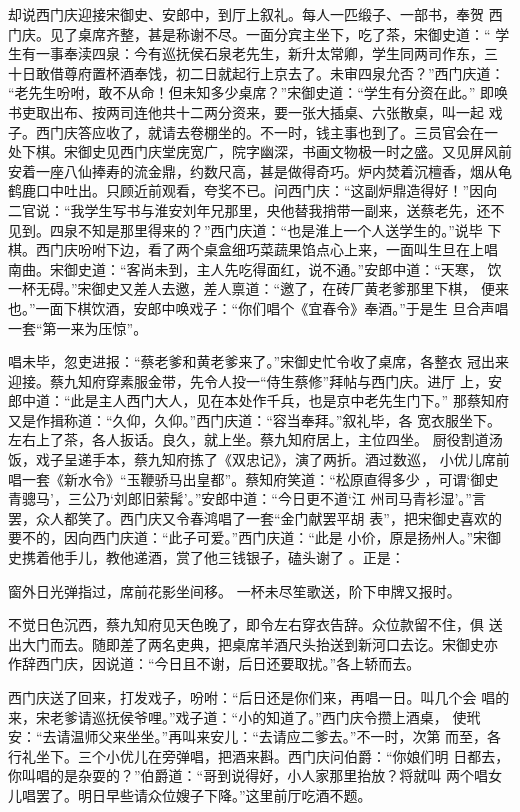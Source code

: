 却说西门庆迎接宋御史、安郎中，到厅上叙礼。每人一匹缎子、一部书，奉贺
西门庆。见了桌席齐整，甚是称谢不尽。一面分宾主坐下，吃了茶，宋御史道：“
学生有一事奉渎四泉：今有巡抚侯石泉老先生，新升太常卿，学生同两司作东，三
十日敢借尊府置杯酒奉饯，初二日就起行上京去了。未审四泉允否？”西门庆道：
“老先生吩咐，敢不从命！但未知多少桌席？”宋御史道：“学生有分资在此。”
即唤书吏取出布、按两司连他共十二两分资来，要一张大插桌、六张散桌，叫一起
戏子。西门庆答应收了，就请去卷棚坐的。不一时，钱主事也到了。三员官会在一
处下棋。宋御史见西门庆堂庑宽广，院字幽深，书画文物极一时之盛。又见屏风前
安着一座八仙捧寿的流金鼎，约数尺高，甚是做得奇巧。炉内焚着沉檀香，烟从龟
鹤鹿口中吐出。只顾近前观看，夸奖不已。问西门庆：“这副炉鼎造得好！”因向
二官说：“我学生写书与淮安刘年兄那里，央他替我捎带一副来，送蔡老先，还不
见到。四泉不知是那里得来的？”西门庆道：“也是淮上一个人送学生的。”说毕
下棋。西门庆吩咐下边，看了两个桌盒细巧菜蔬果馅点心上来，一面叫生旦在上唱
南曲。宋御史道：“客尚未到，主人先吃得面红，说不通。”安郎中道：“天寒，
饮一杯无碍。”宋御史又差人去邀，差人禀道：“邀了，在砖厂黄老爹那里下棋，
便来也。”一面下棋饮酒，安郎中唤戏子：“你们唱个《宜春令》奉酒。”于是生
旦合声唱一套“第一来为压惊”。

唱未毕，忽吏进报：“蔡老爹和黄老爹来了。”宋御史忙令收了桌席，各整衣
冠出来迎接。蔡九知府穿素服金带，先令人投一“侍生蔡修”拜帖与西门庆。进厅
上，安郎中道：“此是主人西门大人，见在本处作千兵，也是京中老先生门下。”
那蔡知府又是作揖称道：“久仰，久仰。”西门庆道：“容当奉拜。”叙礼毕，各
宽衣服坐下。左右上了茶，各人扳话。良久，就上坐。蔡九知府居上，主位四坐。
厨役割道汤饭，戏子呈递手本，蔡九知府拣了《双忠记》，演了两折。酒过数巡，
小优儿席前唱一套《新水令》“玉鞭骄马出皇都”。蔡知府笑道：“松原直得多少
，可谓‘御史青骢马’，三公乃‘刘郎旧萦髯’。”安郎中道：“今日更不道‘江
州司马青衫湿’。”言罢，众人都笑了。西门庆又令春鸿唱了一套“金门献罢平胡
表”，把宋御史喜欢的要不的，因向西门庆道：“此子可爱。”西门庆道：“此是
小价，原是扬州人。”宋御史携着他手儿，教他递酒，赏了他三钱银子，磕头谢了
。正是：

窗外日光弹指过，席前花影坐间移。
一杯未尽笙歌送，阶下申牌又报时。

不觉日色沉西，蔡九知府见天色晚了，即令左右穿衣告辞。众位款留不住，俱
送出大门而去。随即差了两名吏典，把桌席羊酒尺头抬送到新河口去讫。宋御史亦
作辞西门庆，因说道：“今日且不谢，后日还要取扰。”各上轿而去。

西门庆送了回来，打发戏子，吩咐：“后日还是你们来，再唱一日。叫几个会
唱的来，宋老爹请巡抚侯爷哩。”戏子道：“小的知道了。”西门庆令攒上酒桌，
使玳安：“去请温师父来坐坐。”再叫来安儿：“去请应二爹去。”不一时，次第
而至，各行礼坐下。三个小优儿在旁弹唱，把酒来斟。西门庆问伯爵：“你娘们明
日都去，你叫唱的是杂耍的？”伯爵道：“哥到说得好，小人家那里抬放？将就叫
两个唱女儿唱罢了。明日早些请众位嫂子下降。”这里前厅吃酒不题。

